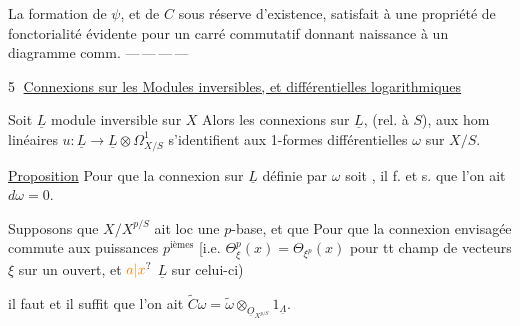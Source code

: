 La formation de $\psi$, et de $C$ sous réserve d'existence, satisfait à une propriété de fonctorialité évidente pour un carré commutatif
donnant naissance à un diagramme comm.
\noindent ---\,---\,---\,---

\textcircled{5}  \uline{Connexions sur les Modules inversibles, et différentielles logarithmiques}

Soit $\underline L$ module inversible sur $X$   Alors les connexions \inserted{$\Delta$} sur $\underline L$,  (rel. à $S$),  aux hom linéaires $u:\underline L\longrightarrow\underline L\otimes\Omega^1_{X/S}$  s'identifient aux 1-formes différentielles  $\omega$ sur $X/S$.

\uline{Proposition}\quad {} Pour que la connexion sur $\underline L$ définie par $\omega$ soit , il f. et s. que l'on ait $d\omega=0$.

 Supposons que $X/X^{p/S}$ ait loc une $p$-base, et que  Pour que la connexion envisagée commute aux puissances $p^{\text{ièmes}}$ [i.e. $\Theta_\xi^p(x)=\Theta_{\xi^p}(x)$ pour tt champ de vecteurs $\xi$ sur un ouvert, et  $\unsure{a|x}$  $\underline L$ sur celui-ci)

il faut et il suffit que l'on ait $\widetilde C\omega=\widetilde\omega\otimes_{\underline O_{X^{p/S}}}1_{\underline\Lambda}$.


